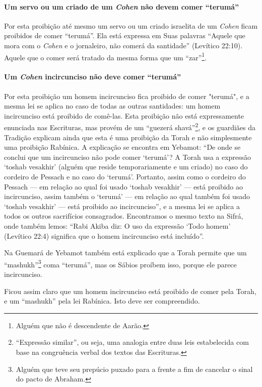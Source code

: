 \paragraph{Um servo ou um criado de um \textit{Cohen} não devem comer ``terumá''}

Por esta proibição até mesmo um servo ou um criado israelita de um
\textit{Cohen} ficam proibidos de comer ``terumá''. Ela está expressa em Suas
palavras ``Aquele que mora com o \textit{Cohen} e o jornaleiro, não comerá da
santidade'' (Levítico 22:10). Aquele que o comer será tratado da mesma
forma que um ``zar''\footnote{Alguém que não é descendente de Aarão.}.

\paragraph{Um \textit{Cohen} incircunciso não deve comer ``terumá''}

Por esta proibição um homem incircunciso fica proibido de comer
"terumá", e a mesma lei se aplica no caso de todas as outras santidades:
um homem incircunciso está proibido de comê-las. Esta proibição não está
expressamente enunciada nas Escrituras, mas provém de um ``guezerá
shavá''\footnote{``Expressão similar'', ou seja, uma analogia entre duas leis
  estabelecida com base na congruência verbal dos textos das Escrituras.}, e os guardiães da Tradição explicam ainda
que esta é uma proibição da Torah e não simplesmente uma proibição
Rabínica. A explicação se encontra em Yebamot: ``De onde se conclui que
um incircunciso não pode comer `terumá'? A Torah usa a expressão `toshab
vesakhir' (alguém que reside temporariamente e um criado) no caso do
cordeiro de Pessach e no caso do `terumá'. Portanto, assim como o
cordeiro do Pessach --- em relação ao qual foi usado `toshab vesakhir'
--- está proibido ao incircunciso, assim também o `terumá' --- em
relação ao qual também foi usado `toshab vesakhir' --- está proibido ao
incircunciso'', e a mesma lei se aplica a todos os outros sacrifícios
consagrados. Encontramos o mesmo texto na Sifrá, onde também lemos:
``Rabi Akiba diz: O uso da expressão `Todo homem' (Levítico 22:4)
significa que o homem incircunciso está incluído''.

Na Guemará de Yebamot também está explicado que a Torah permite que um
``mashukh''\footnote{Alguém que teve seu prepúcio puxado para a frente a fim de cancelar o sinal do pacto de Abraham.} coma ``terumá'', mas os Sábios proíbem
isso, porque ele parece incircunciso.

Ficou assim claro que um homem incircunciso está proibido de comer pela
Torah, e um ``mashukh'' pela lei Rabínica. Isto deve ser compreendido.

